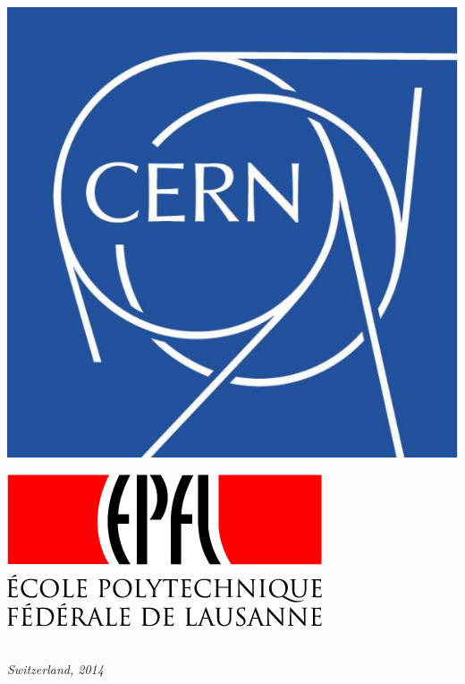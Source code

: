 \begin{titlepage}
\begin{minipage}{0.4\textwidth}
    \includegraphics[scale=0.1]{static/img/cern.jpg}
  \end{minipage}
  \begin{minipage}{0.4\textwidth}
    \centering
    \includegraphics[scale=0.355]{static/img/epfl.jpg}
  \end{minipage}
  \\\vspace*{1\baselineskip}
  \textit{Switzerland, 2014}
\end{titlepage}
